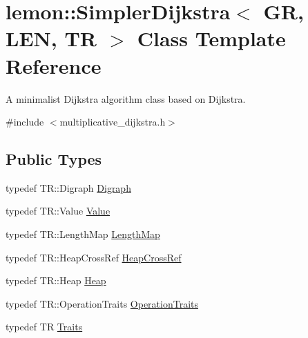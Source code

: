 \hypertarget{classlemon_1_1_simpler_dijkstra}{}\section{lemon\+:\+:Simpler\+Dijkstra$<$ GR, L\+EN, TR $>$ Class Template Reference}
\label{classlemon_1_1_simpler_dijkstra}


A minimalist Dijkstra algorithm class based on Dijkstra.  




{\ttfamily \#include $<$multiplicative\+\_\+dijkstra.\+h$>$}

\subsection*{Public Types}
\begin{DoxyCompactItemize}
\item 
typedef T\+R\+::\+Digraph \hyperlink{classlemon_1_1_simpler_dijkstra_ac19103e2c76d2258f7507dd5921d814d}{Digraph}
\item 
typedef T\+R\+::\+Value \hyperlink{classlemon_1_1_simpler_dijkstra_adbbec2bbc5762ccc02fee8089e30836a}{Value}
\item 
typedef T\+R\+::\+Length\+Map \hyperlink{classlemon_1_1_simpler_dijkstra_adfe5498ef0a7699daf396dd6c4b7dfb6}{Length\+Map}
\item 
typedef T\+R\+::\+Heap\+Cross\+Ref \hyperlink{classlemon_1_1_simpler_dijkstra_ae4c36812930d6292b4154e26b76ea10f}{Heap\+Cross\+Ref}
\item 
typedef T\+R\+::\+Heap \hyperlink{classlemon_1_1_simpler_dijkstra_aafddddfbd1c0c9c054fffa959a2a1a3f}{Heap}
\item 
typedef T\+R\+::\+Operation\+Traits \hyperlink{classlemon_1_1_simpler_dijkstra_a324250f3aac580ddcc57cb2a84d5e9cd}{Operation\+Traits}
\item 
typedef TR \hyperlink{classlemon_1_1_simpler_dijkstra_aba2e25936434ef18b495a05a4b785220}{Traits}
\end{DoxyCompactItemize}
